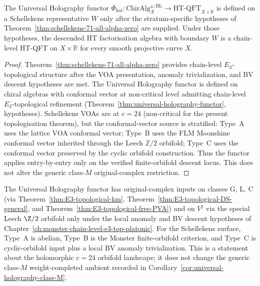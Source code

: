 \begin{corollary}
\label{cor:schellekens-71-uhf-image}
The Universal Holography functor
$\Phi_{\mathrm{hol}}\colon \mathrm{ChirAlg}^{\omega,\mathrm{BL}}_X
\to \mathrm{HT\text{-}QFT}_{X \times \mathbb{R}}$
is defined on a Schellekens representative $W$ only after the
stratum-specific hypotheses of
Theorem~\ref{thm:schellekens-71-all-alpha-zero} are supplied. Under
those hypotheses, the descended HT factorisation algebra with boundary
$W$ is a chain-level HT-QFT on $X \times \mathbb{R}$ for every smooth
projective curve $X$.
\end{corollary}

\begin{proof}
Theorem~\ref{thm:schellekens-71-all-alpha-zero} provides chain-level
$E_3$-topological structure after the VOA presentation, anomaly
trivialization, and BV descent hypotheses are met. The Universal
Holography functor is defined on
chiral algebras with conformal vector at non-critical level
admitting chain-level $E_3$-topological refinement
(Theorem~\ref*{thm:universal-holography-functor}, hypotheses).
Schellekens VOAs are at $c = 24$ (non-critical for the present
topologisation theorem), but the conformal-vector source is
stratified: Type~A uses the lattice VOA conformal vector; Type~B uses
the FLM Moonshine conformal vector inherited through the Leech
$\mathbb Z/2$ orbifold; Type~C uses the conformal vector preserved by
the cyclic orbifold construction. Thus the functor applies
entry-by-entry only on the verified finite-orbifold descent locus. This
does not alter the generic class-$M$ original-complex restriction.
\end{proof}

\begin{remark}
\label{rem:uhf-class-coverage-update}
The Universal Holography functor has original-complex inputs on
classes G, L, C (via Theorem~\ref*{thm:E3-topological-km},
Theorem~\ref*{thm:E3-topological-DS-general}, and
Theorem~\ref*{thm:E3-topological-free-PVA}) and on $V^\natural$ via
the special Leech $\Z/2$ orbifold only under the local anomaly and BV
descent hypotheses of
Chapter~\ref*{ch:monster-chain-level-e3-top-platonic}. For the
Schellekens surface, Type~A is abelian, Type~B is the Monster
finite-orbifold criterion, and Type~C is cyclic-orbifold input plus a
local BV anomaly trivialization. This is a statement about the
holomorphic $c=24$ orbifold landscape; it does not change the generic
class-$M$ weight-completed ambient recorded in
Corollary~\ref*{cor:universal-holography-class-M}.
\end{remark}

